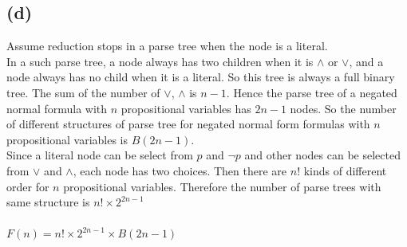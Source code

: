 \documentclass{article} %
\begin{document}
\subsection*{(d)}
Assume reduction stops in a parse tree when the node is a literal.\\
In a such parse tree, a node always has two children when it is $\wedge$ or $\vee$, and a node always has no child when it is a literal. So this tree is always a full binary tree. The sum of the number of $\vee$, $\wedge$ is $n - 1$. Hence the parse tree of a negated normal formula with $n$ propositional variables has $2n -1$ nodes. So the number of different structures of parse tree for negated normal form formulas with $n$ propositional variables is $B(2n-1)$.\\
Since a literal node can be select from $p$ and $\neg p$ and other nodes can be selected from $\vee$ and $\wedge$, each node has two choices. Then there are $n!$ kinds of different order for $n$ propositional variables. Therefore the number of parse trees with same structure is $n!\times 2^{2n-1}$\\
\\
$F(n) = n! \times 2^{2n-1} \times B(2n -1)$\\
\end{document}
